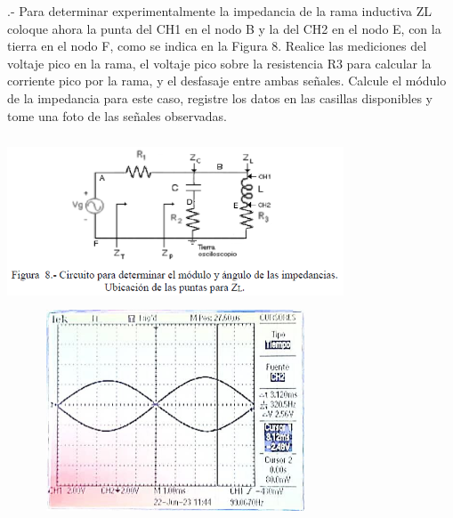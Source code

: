 \documentclass[12pt]{article}
\begin{document}
	.- Para determinar experimentalmente la impedancia de la rama inductiva ZL coloque ahora la punta del CH1 en el nodo B y la del CH2 en el nodo E, con la tierra en el nodo F, como se indica en la Figura 8. Realice las mediciones del voltaje pico en la rama, el voltaje pico sobre la resistencia R3 para calcular la corriente pico por la rama, y el desfasaje entre ambas señales. Calcule el módulo de la impedancia para este caso, registre los datos en las casillas disponibles y tome una foto de las señales observadas.
	
	\begin{center}
		\includegraphics[width=10cm,height=5cm]{Img/Captura}\\
		\includegraphics[width=10cm,height=6cm]{Img/resul_16}\\
	\end{center}
	
\end{document}
